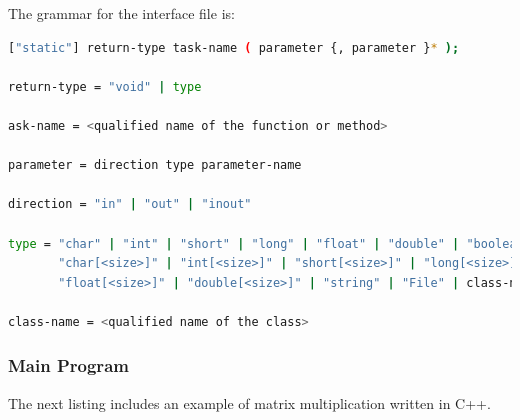 The grammar for the interface file is:

\begin{lstlisting}[language=bash]
["static"] return-type task-name ( parameter {, parameter }* );

return-type = "void" | type

ask-name = <qualified name of the function or method>

parameter = direction type parameter-name

direction = "in" | "out" | "inout"

type = "char" | "int" | "short" | "long" | "float" | "double" | "boolean" |
       "char[<size>]" | "int[<size>]" | "short[<size>]" | "long[<size>]" |
       "float[<size>]" | "double[<size>]" | "string" | "File" | class-name

class-name = <qualified name of the class>
\end{lstlisting}



\subsubsection{Main Program}
The next listing includes an example of matrix multiplication written in C++.


